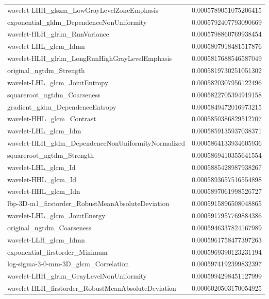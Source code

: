 {\begin{xltabular}[H]{\textwidth}{X r}
        wavelet-LHH\_glszm\_LowGrayLevelZoneEmphasis & 0.0005789051075206415 \\
        exponential\_gldm\_DependenceNonUniformity & 0.0005792407793090669 \\
        wavelet-HLH\_glrlm\_RunVariance & 0.0005798860769938454 \\
        wavelet-LHL\_glcm\_Idmn & 0.0005807918481517876 \\
        wavelet-HLH\_glrlm\_LongRunHighGrayLevelEmphasis & 0.0005817688546587049 \\
        original\_ngtdm\_Strength & 0.0005819730251051302 \\
        wavelet-LHL\_glcm\_JointEntropy & 0.0005820307956122496 \\
        squareroot\_ngtdm\_Coarseness & 0.0005822705394919158 \\
        gradient\_gldm\_DependenceEntropy & 0.0005849472016973215 \\
        wavelet-HHL\_glcm\_Contrast & 0.0005850386829512707 \\
        wavelet-LHL\_glcm\_Idm & 0.0005859135937038371 \\
        wavelet-HLH\_gldm\_DependenceNonUniformityNormalized & 0.0005864133934605936 \\
        squareroot\_ngtdm\_Strength & 0.0005869410355641554 \\
        wavelet-LHL\_glcm\_Id & 0.0005885428987938267 \\
        wavelet-HHL\_glcm\_Id & 0.0005893657516554898 \\
        wavelet-HHL\_glcm\_Idn & 0.0005897061998526727 \\
        lbp-3D-m1\_firstorder\_RobustMeanAbsoluteDeviation & 0.0005915896508048865 \\
        wavelet-LHL\_glcm\_JointEnergy & 0.0005917957769884386 \\
        original\_ngtdm\_Coarseness & 0.0005946337824167989 \\
        wavelet-LLH\_glcm\_Idmn & 0.0005961758477397263 \\
        exponential\_firstorder\_Minimum & 0.0005969390123231194 \\
        log-sigma-3-0-mm-3D\_glcm\_Correlation & 0.0005974192399832397 \\
        wavelet-LHH\_glrlm\_GrayLevelNonUniformity & 0.0005994298451127999 \\
        wavelet-HLH\_firstorder\_RobustMeanAbsoluteDeviation & 0.0006020503170054925 \\

\end{xltabular}}
